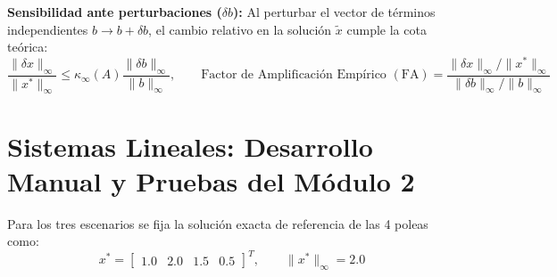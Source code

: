 \documentclass[a4paper,12pt]{article}
\begin{document}
\textbf{Sensibilidad ante perturbaciones ($\delta b$):} Al perturbar el vector de términos independientes $b \to b + \delta b$, el cambio relativo en la solución $\tilde{x}$ cumple la cota teórica:
\begin{equation}
    \frac{\|\delta x\|_\infty}{\|x^*\|_\infty} \le \kappa_\infty(A) \frac{\|\delta b\|_\infty}{\|b\|_\infty}, \qquad \text{Factor de Amplificación Empírico } (\text{FA}) = \frac{\|\delta x\|_\infty / \|x^*\|_\infty}{\|\delta b\|_\infty / \|b\|_\infty}
\end{equation}

\section{Sistemas Lineales: Desarrollo Manual y Pruebas del Módulo 2}

Para los tres escenarios se fija la solución exacta de referencia de las 4 poleas como:
\begin{equation}
    x^* = \begin{bmatrix} 1.0 & 2.0 & 1.5 & 0.5 \end{bmatrix}^T, \qquad \|x^*\|_\infty = 2.0
\end{equation}
\end{document}
